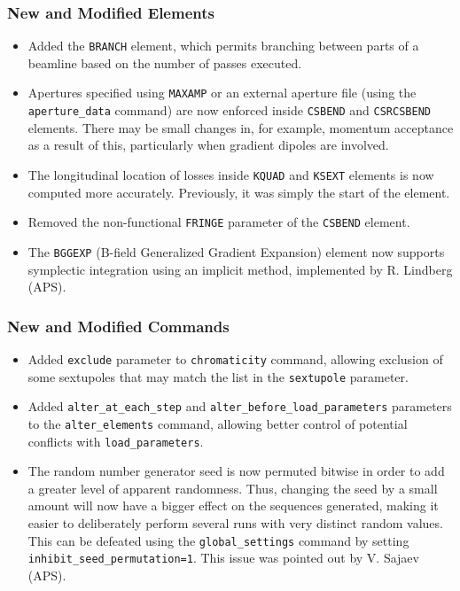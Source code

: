 \documentclass[11pt]{article}
\begin{document}
\subsubsection{New and Modified Elements}
\begin{itemize}
\item Added the \verb|BRANCH| element, which permits branching between parts of a beamline based on the number of passes executed.
\item Apertures specified using \verb|MAXAMP| or an external aperture file (using the \verb|aperture_data| command) are now
  enforced inside \verb|CSBEND| and \verb|CSRCSBEND| elements.
  There may be small changes in, for example, momentum acceptance as a result of this, particularly when gradient dipoles are involved. 
\item The longitudinal location of losses inside \verb|KQUAD| and \verb|KSEXT| elements is now computed more accurately. Previously,
  it was simply the start of the element.
\item Removed the non-functional \verb|FRINGE| parameter of the \verb|CSBEND| element.
\item The \verb|BGGEXP| (B-field Generalized Gradient Expansion) element now supports symplectic integration using an
  implicit method, implemented by R. Lindberg (APS).
\end{itemize}

\subsubsection{New and Modified Commands}
\begin{itemize}
\item Added \verb|exclude| parameter to \verb|chromaticity| command, allowing exclusion of some sextupoles that may 
  match the list in the \verb|sextupole| parameter.
\item Added \verb|alter_at_each_step| and \verb|alter_before_load_parameters| parameters to the \verb|alter_elements| command,
  allowing better control of potential conflicts with \verb|load_parameters|.
\item The random number generator seed is now permuted bitwise in order to add a greater level of apparent randomness.
  Thus, changing the seed by a small amount will now have a bigger effect on the sequences generated, making it easier to
  deliberately perform several runs with very distinct random values.
  This can be defeated using the \verb|global_settings| command by setting \verb|inhibit_seed_permutation=1|.
  This issue was pointed out by V. Sajaev (APS).
\end{itemize}
\end{document}
